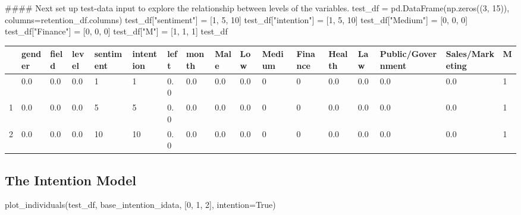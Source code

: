 \documentclass[
  letterpaper,
  DIV=11,
  numbers=noendperiod]{scrartcl}
\newenvironment{Shaded}{\begin{snugshade}}{\end{snugshade}}
\newcommand{\CommentTok}[1]{\textcolor[rgb]{0.37,0.37,0.37}{#1}}
\newcommand{\DecValTok}[1]{\textcolor[rgb]{0.68,0.00,0.00}{#1}}
\newcommand{\NormalTok}[1]{\textcolor[rgb]{0.00,0.23,0.31}{#1}}
\newcommand{\OperatorTok}[1]{\textcolor[rgb]{0.37,0.37,0.37}{#1}}
\newcommand{\StringTok}[1]{\textcolor[rgb]{0.13,0.47,0.30}{#1}}
\newcommand{\VariableTok}[1]{\textcolor[rgb]{0.07,0.07,0.07}{#1}}
\begin{document}
\begin{Shaded}
\begin{Highlighting}[]
\CommentTok{\#\#\#\# Next set up test{-}data input to explore the relationship between levels of the variables.}
\NormalTok{test\_df }\OperatorTok{=}\NormalTok{ pd.DataFrame(np.zeros((}\DecValTok{3}\NormalTok{, }\DecValTok{15}\NormalTok{)), columns}\OperatorTok{=}\NormalTok{retention\_df.columns)}
\NormalTok{test\_df[}\StringTok{"sentiment"}\NormalTok{] }\OperatorTok{=}\NormalTok{ [}\DecValTok{1}\NormalTok{, }\DecValTok{5}\NormalTok{, }\DecValTok{10}\NormalTok{]}
\NormalTok{test\_df[}\StringTok{"intention"}\NormalTok{] }\OperatorTok{=}\NormalTok{ [}\DecValTok{1}\NormalTok{, }\DecValTok{5}\NormalTok{, }\DecValTok{10}\NormalTok{]}
\NormalTok{test\_df[}\StringTok{"Medium"}\NormalTok{] }\OperatorTok{=}\NormalTok{ [}\DecValTok{0}\NormalTok{, }\DecValTok{0}\NormalTok{, }\DecValTok{0}\NormalTok{]}
\NormalTok{test\_df[}\StringTok{"Finance"}\NormalTok{] }\OperatorTok{=}\NormalTok{ [}\DecValTok{0}\NormalTok{, }\DecValTok{0}\NormalTok{, }\DecValTok{0}\NormalTok{]}
\NormalTok{test\_df[}\StringTok{"M"}\NormalTok{] }\OperatorTok{=}\NormalTok{ [}\DecValTok{1}\NormalTok{, }\DecValTok{1}\NormalTok{, }\DecValTok{1}\NormalTok{]}
\NormalTok{test\_df}
\end{Highlighting}
\end{Shaded}

\begin{longtable}[]{@{}lllllllllllllllll@{}}
\toprule\noalign{}
& gender & field & level & sentiment & intention & left & month & Male &
Low & Medium & Finance & Health & Law & Public/Government &
Sales/Marketing & M \\
\midrule\noalign{}
\endhead
\bottomrule\noalign{}
\endlastfoot
0 & 0.0 & 0.0 & 0.0 & 1 & 1 & 0.0 & 0.0 & 0.0 & 0.0 & 0 & 0 & 0.0 & 0.0
& 0.0 & 0.0 & 1 \\
1 & 0.0 & 0.0 & 0.0 & 5 & 5 & 0.0 & 0.0 & 0.0 & 0.0 & 0 & 0 & 0.0 & 0.0
& 0.0 & 0.0 & 1 \\
2 & 0.0 & 0.0 & 0.0 & 10 & 10 & 0.0 & 0.0 & 0.0 & 0.0 & 0 & 0 & 0.0 &
0.0 & 0.0 & 0.0 & 1 \\
\end{longtable}

\subsection{The Intention Model}\label{the-intention-model}

\begin{Shaded}
\begin{Highlighting}[]
\NormalTok{plot\_individuals(test\_df, base\_intention\_idata, [}\DecValTok{0}\NormalTok{, }\DecValTok{1}\NormalTok{, }\DecValTok{2}\NormalTok{], intention}\OperatorTok{=}\VariableTok{True}\NormalTok{)}
\end{Highlighting}
\end{Shaded}
\end{document}
